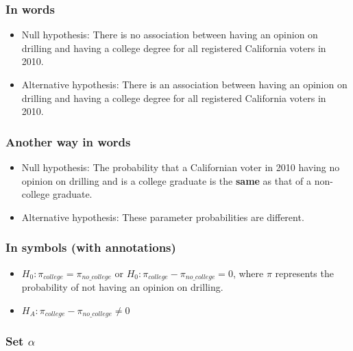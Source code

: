 \documentclass[12pt, krantz2,]{krantz}
\providecommand{\tightlist}{%
  \setlength{\itemsep}{0pt}\setlength{\parskip}{0pt}}
\begin{document}
\hypertarget{in-words-2}{%
\subsubsection*{In words}\label{in-words-2}}


\begin{itemize}
\item
  Null hypothesis: There is no association between having an opinion on drilling and having a college degree for all registered California voters in 2010.
\item
  Alternative hypothesis: There is an association between having an opinion on drilling and having a college degree for all registered California voters in 2010.
\end{itemize}

\hypertarget{another-way-in-words}{%
\subsubsection*{Another way in words}\label{another-way-in-words}}


\begin{itemize}
\item
  Null hypothesis: The probability that a Californian voter in 2010 having no opinion on drilling and is a college graduate is the \textbf{same} as that of a non-college graduate.
\item
  Alternative hypothesis: These parameter probabilities are different.
\end{itemize}

\hypertarget{in-symbols-with-annotations-2}{%
\subsubsection*{In symbols (with annotations)}\label{in-symbols-with-annotations-2}}


\begin{itemize}
\tightlist
\item
  \(H_0: \pi_{college} = \pi_{no\_college}\) or \(H_0: \pi_{college} - \pi_{no\_college} = 0\), where \(\pi\) represents the probability of not having an opinion on drilling.
\item
  \(H_A: \pi_{college} - \pi_{no\_college} \ne 0\)
\end{itemize}

\hypertarget{set-alpha-2}{%
\subsubsection*{\texorpdfstring{Set \(\alpha\)}{Set \textbackslash{}alpha}}\label{set-alpha-2}}
\end{document}
